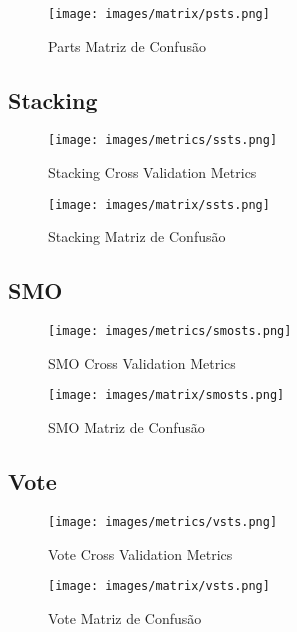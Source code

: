 \begin{figure}[H]
  \centering
  \texttt{[image: images/matrix/psts.png]}
  \caption{Parts Matriz de Confusão}
  \label{fig:p_sts_matrix}
\end{figure}

\subsection{Stacking}

\begin{figure}[H]
  \centering
  \texttt{[image: images/metrics/ssts.png]}
  \caption{Stacking Cross Validation Metrics}
  \label{fig:s_sts_metrics}
\end{figure}

\begin{figure}[H]
  \centering
  \texttt{[image: images/matrix/ssts.png]}
  \caption{Stacking Matriz de Confusão}
  \label{fig:s_sts_matrix}
\end{figure}

\subsection{SMO}

\begin{figure}[H]
  \centering
  \texttt{[image: images/metrics/smosts.png]}
  \caption{SMO Cross Validation Metrics}
  \label{fig:smo_sts_metrics}
\end{figure}

\begin{figure}[H]
  \centering
  \texttt{[image: images/matrix/smosts.png]}
  \caption{SMO Matriz de Confusão}
  \label{fig:smo_sts_matrix}
\end{figure}

\subsection{Vote}

\begin{figure}[H]
  \centering
  \texttt{[image: images/metrics/vsts.png]}
  \caption{Vote Cross Validation Metrics}
  \label{fig:v_sts_metrics}
\end{figure}

\begin{figure}[H]
  \centering
  \texttt{[image: images/matrix/vsts.png]}
  \caption{Vote Matriz de Confusão}
  \label{fig:v_sts_matrix}
\end{figure}
